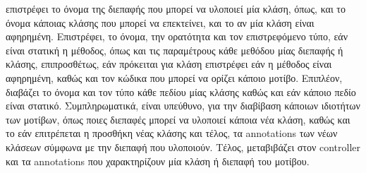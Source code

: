 επιστρέφει το όνομα της διεπαφής που μπορεί να υλοποιεί μία κλάση, όπως, και το όνομα κάποιας κλάσης που μπορεί να επεκτείνει, 
και το αν μία κλάση είναι αφηρημένη. Επιστρέφει, το όνομα, την ορατότητα και τον επιστρεφόμενο τύπο, εάν είναι στατική η μέθοδος, 
όπως και τις παραμέτρους κάθε μεθόδου μίας διεπαφής ή κλάσης, επιπροσθέτως, εάν πρόκειται για κλάση επιστρέφει 
εάν η μέθοδος είναι αφηρημένη, καθώς και τον κώδικα που μπορεί να ορίζει κάποιο μοτίβο. Επιπλέον, 
διαβάζει το όνομα και τον τύπο κάθε πεδίου μίας κλάσης καθώς και εάν κάποιο πεδίο είναι στατικό.
Συμπληρωματικά, είναι υπεύθυνο, για την διαβίβαση κάποιων ιδιοτήτων των μοτίβων, όπως ποιες διεπαφές μπορεί 
να υλοποιεί κάποια νέα κλάση, καθώς και το εάν επιτρέπεται η προσθήκη νέας κλάσης και τέλος, τα annotations των νέων κλάσεων 
σύμφωνα με την διεπαφή που υλοποιούν. Τέλος, μεταβιβάζει στον controller και τα annotations που χαρακτηρίζουν μία κλάση ή διεπαφή του μοτίβου.
